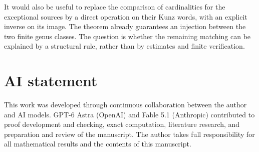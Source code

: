 \documentclass[11pt]{amsart}
\theoremstyle{definition}
\theoremstyle{remark}
\numberwithin{equation}{section}
\begin{document}
It would also be useful to replace the comparison of cardinalities
for the exceptional sources by a direct operation on their Kunz words,
with an explicit inverse on its image. The theorem already guarantees
an injection between the two finite genus classes. The question is
whether the remaining matching can be explained by a structural rule,
rather than by estimates and finite verification.


\section*{AI statement}
This work was developed through continuous collaboration between the
author and AI models. GPT-6 Astra (OpenAI) and Fable 5.1 (Anthropic)
contributed to proof development and checking, exact computation,
literature research, and preparation and review of the manuscript.
The author takes full responsibility for all mathematical results
and the contents of this manuscript.
\end{document}
